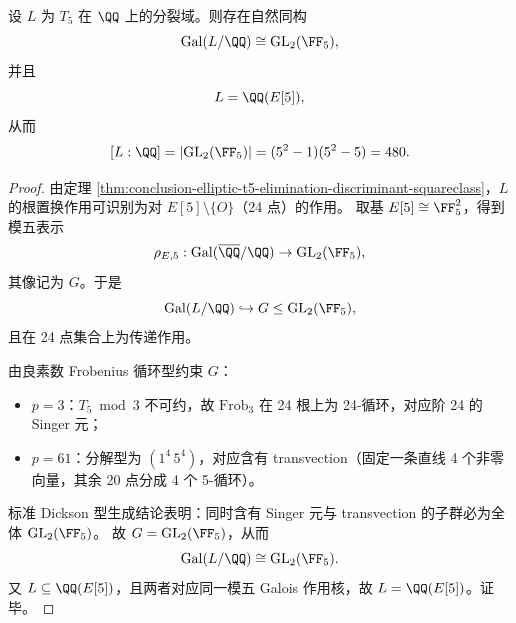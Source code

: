 \begin{theorem}\label{thm:conclusion-elliptic-t5-galois-gl2f5}
设 \(L\) 为 \(T_5\) 在 \(\QQ\) 上的分裂域。则存在自然同构
\[
\mathrm{Gal}(L/\QQ)\cong \mathrm{GL}_2(\FF_5),
\]
并且
\[
L=\QQ(E[5]),
\]
从而
\[
[L:\QQ]=|\mathrm{GL}_2(\FF_5)|=(5^2-1)(5^2-5)=480.
\]
\end{theorem}
\begin{proof}
由定理 \ref{thm:conclusion-elliptic-t5-elimination-discriminant-squareclass}，\(L\) 的根置换作用可识别为对 \(E[5]\setminus\{O\}\)（24 点）的作用。
取基 \(E[5]\cong \FF_5^2\)，得到模五表示
\[
\rho_{E,5}:\mathrm{Gal}(\overline{\QQ}/\QQ)\to \mathrm{GL}_2(\FF_5),
\]
其像记为 \(G\)。于是
\[
\mathrm{Gal}(L/\QQ)\hookrightarrow G\le \mathrm{GL}_2(\FF_5),
\]
且在 24 点集合上为传递作用。

由良素数 Frobenius 循环型约束 \(G\)：
\begin{itemize}
  \item \(p=3\)：\(T_5\bmod 3\) 不可约，故 \(\mathrm{Frob}_3\) 在 24 根上为 24-循环，对应阶 24 的 Singer 元；
  \item \(p=61\)：分解型为 \((1^4\,5^4)\)，对应含有 transvection（固定一条直线 4 个非零向量，其余 20 点分成 4 个 5-循环）。
\end{itemize}
标准 Dickson 型生成结论表明：同时含有 Singer 元与 transvection 的子群必为全体 \(\mathrm{GL}_2(\FF_5)\)。
故 \(G=\mathrm{GL}_2(\FF_5)\)，从而
\[
\mathrm{Gal}(L/\QQ)\cong \mathrm{GL}_2(\FF_5).
\]
又 \(L\subseteq \QQ(E[5])\)，且两者对应同一模五 Galois 作用核，故 \(L=\QQ(E[5])\)。证毕。
\end{proof}



